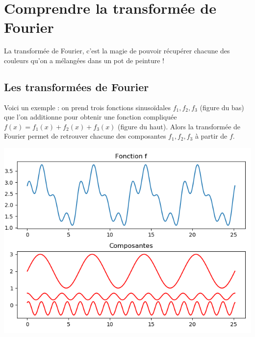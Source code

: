\documentclass[11pt,class=report,crop=false]{standalone}
\begin{document}




\section{Comprendre la transformée de Fourier}

La transformée de Fourier, c'est la magie de pouvoir récupérer chacune des couleurs qu'on a mélangées dans un pot de peinture !

\subsection{Les transformées de Fourier}

Voici un exemple : on prend trois fonctions sinusoïdales $f_1, f_2, f_3$ (figure du bas) que l'on additionne pour obtenir une fonction compliquée $f(x) = f_1(x) + f_2(x) + f_3(x)$ (figure du haut). Alors la transformée de Fourier permet de retrouver chacune des composantes $f_1, f_2, f_3$ à partir de $f$.

\begin{center}
\includegraphics[scale=\myscale,scale=0.7]{figures/fourier-1}
\end{center}
\end{document}
